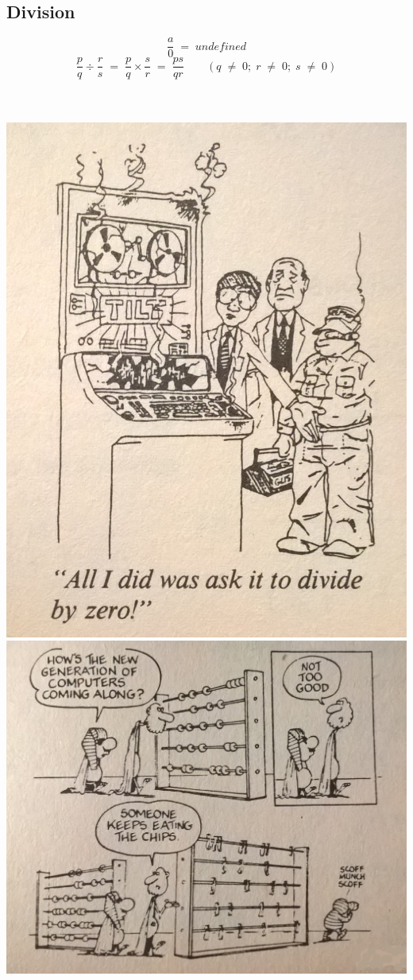 \subsection{Division}
\[\frac{a}{0} \; = \; undefined\]
\[\frac{p}{q} \div \frac{r}{s} \; = \; \frac{p}{q} \times \frac{s}{r} \; = \; \frac{ps}{qr} \qquad (q \; \neq \; 0; \; r \; \neq \; 0; \; s \; \neq \; 0)\]
\\
\\
\begin{minipage}{\linewidth}
\includegraphics[scale=0.2]{./image/Math/dividebyzero.jpg}
\includegraphics[scale=0.12]{./image/Math/newgencomputer.jpg}
\end{minipage}
\\
\\
